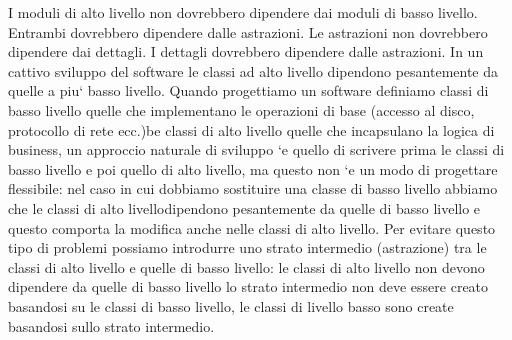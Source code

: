 \documentclass[a4paper, oneside]{book}
\begin{document}
\begin{enumerate}
I moduli di alto livello non dovrebbero dipendere dai moduli di basso livello. Entrambi dovrebbero dipendere dalle astrazioni. Le astrazioni non dovrebbero dipendere dai dettagli. I dettagli dovrebbero dipendere dalle astrazioni. In un cattivo sviluppo del software le classi ad alto livello dipendono pesantemente da quelle a piu` basso livello. Quando progettiamo un software definiamo classi di basso livello quelle che implementano le operazioni di base (accesso al disco, protocollo di rete ecc.)be classi di alto livello quelle che incapsulano la logica di business, un approccio naturale di sviluppo `e quello di scrivere prima le classi di basso livello e poi quello di alto livello, ma questo non `e un modo di progettare flessibile: nel caso in cui dobbiamo sostituire una classe di basso livello abbiamo che le classi di alto livellodipendono pesantemente da quelle di basso livello e questo comporta la modifica anche nelle classi di alto livello. Per evitare questo tipo di problemi possiamo introdurre uno strato intermedio (astrazione) tra le classi di alto livello e quelle di basso livello: le classi di alto livello non devono dipendere da quelle di basso livello lo strato intermedio non deve essere creato basandosi su le classi di basso livello, le classi di livello basso sono create basandosi sullo strato intermedio.
\end{enumerate}
\end{document}
